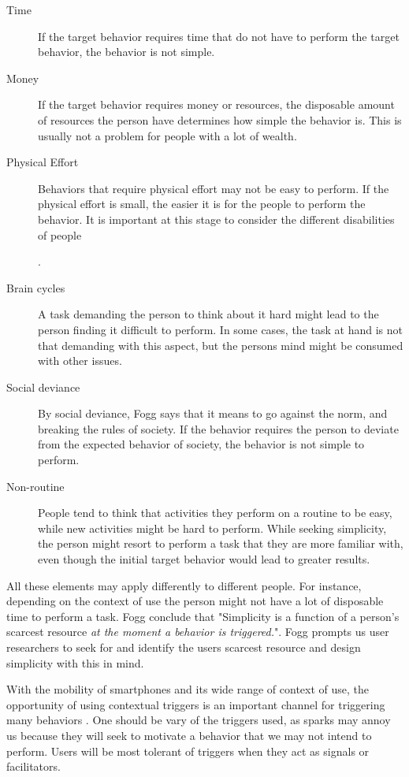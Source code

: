 \begin{description}
  \item[Time] If the target behavior requires time that do not have to perform the target behavior, the behavior is not simple.
  \item[Money] If the target behavior requires money or resources, the disposable amount of resources the person have determines how simple the behavior is. This is usually not a problem for people with a lot of wealth.
  \item[Physical Effort] Behaviors that require physical effort may not be easy to perform. If the physical effort is small, the easier it is for the people to perform the behavior. It is important at this stage to consider the different disabilities of people.
  \item[Brain cycles] A task demanding the person to think about it hard might lead to the person finding it difficult to perform. In some cases, the task at hand is not that demanding with this aspect, but the persons mind might be consumed with other issues.
  \item[Social deviance] By social deviance, Fogg says that it means to go against the norm, and breaking the rules of society. If the behavior requires the person to deviate from the expected behavior of society, the behavior is not simple to perform.
  \item[Non-routine] People tend to think that activities they perform on a routine to be easy, while new activities might be hard to perform. While seeking simplicity, the person might resort to perform a task that they are more familiar with, even though the initial target behavior would lead to greater results.
\end{description}

All these elements may apply differently to different people. For instance, depending on the context of use the person might not have a lot of disposable time to perform a task. Fogg conclude that "Simplicity is a function of a person's scarcest resource \textit{at the moment a behavior is triggered.}". Fogg prompts us user researchers to seek for and identify the users scarcest resource and design simplicity with this in mind.

With the mobility of smartphones and its wide range of context of use, the opportunity of using contextual triggers is an important channel for triggering many behaviors \cite{Fogg2009}. One should be vary of the triggers used, as sparks may annoy us because they will seek to motivate a behavior that we may not intend to perform. Users will be most tolerant of triggers when they act as signals or facilitators.

